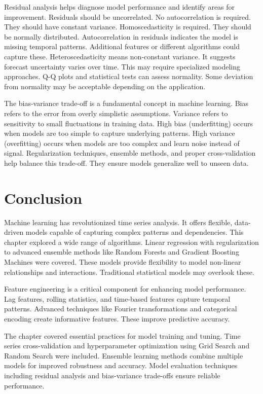 Residual analysis helps diagnose model performance and identify areas for improvement. Residuals should be uncorrelated. No autocorrelation is required. They should have constant variance. Homoscedasticity is required. They should be normally distributed. Autocorrelation in residuals indicates the model is missing temporal patterns. Additional features or different algorithms could capture these. Heteroscedasticity means non-constant variance. It suggests forecast uncertainty varies over time. This may require specialized modeling approaches. Q-Q plots and statistical tests can assess normality. Some deviation from normality may be acceptable depending on the application.

The bias-variance trade-off is a fundamental concept in machine learning. Bias refers to the error from overly simplistic assumptions. Variance refers to sensitivity to small fluctuations in training data. High bias (underfitting) occurs when models are too simple to capture underlying patterns. High variance (overfitting) occurs when models are too complex and learn noise instead of signal. Regularization techniques, ensemble methods, and proper cross-validation help balance this trade-off. They ensure models generalize well to unseen data.



\section{Conclusion}

Machine learning has revolutionized time series analysis. It offers flexible, data-driven models capable of capturing complex patterns and dependencies. This chapter explored a wide range of algorithms. Linear regression with regularization to advanced ensemble methods like Random Forests and Gradient Boosting Machines were covered. These models provide flexibility to model non-linear relationships and interactions. Traditional statistical models may overlook these.

Feature engineering is a critical component for enhancing model performance. Lag features, rolling statistics, and time-based features capture temporal patterns. Advanced techniques like Fourier transformations and categorical encoding create informative features. These improve predictive accuracy.

The chapter covered essential practices for model training and tuning. Time series cross-validation and hyperparameter optimization using Grid Search and Random Search were included. Ensemble learning methods combine multiple models for improved robustness and accuracy. Model evaluation techniques including residual analysis and bias-variance trade-offs ensure reliable performance.

